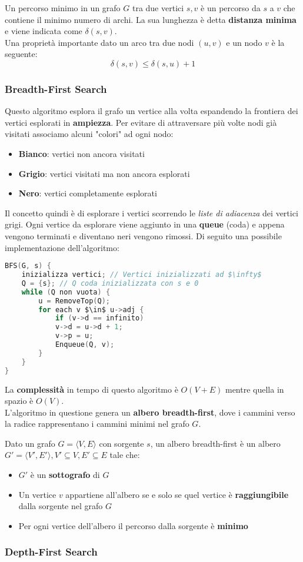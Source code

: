 \begin{definition}
	Un percorso minimo in un grafo $G$ tra due vertici $s, v$ è un percorso da $s$ a $v$  che contiene il minimo numero di archi. La sua lunghezza è detta \textbf{distanza minima} e viene indicata come $\delta(s, v)$. \\
	Una proprietà importante dato un arco tra due nodi $(u,v)$ e un nodo $v$ è la seguente:
	\begin{equation*}
		\delta(s, v) \leq \delta(s, u) + 1
	\end{equation*}
\end{definition}
\subsubsection{Breadth-First Search}
Questo algoritmo esplora il grafo un vertice alla volta espandendo la frontiera dei vertici esplorati in \textbf{ampiezza}. Per evitare di attraversare più volte nodi già visitati associamo alcuni "colori" ad ogni nodo:
\begin{itemize}
	\item \textbf{Bianco}: vertici non ancora visitati
	\item \textbf{Grigio}: vertici visitati ma non ancora esplorati
	\item  \textbf{Nero}: vertici completamente esplorati
\end{itemize}
Il concetto quindi è di esplorare i vertici scorrendo le \emph{liste di adiacenza} dei vertici grigi. Ogni vertice da esplorare viene aggiunto in una \textbf{queue} (coda) e appena vengono terminati e diventano neri vengono rimossi. Di seguito una possibile implementazione dell'algoritmo:
\begin{lstlisting}[language=C, caption=Implementazione di BFS, mathescape=true]
BFS(G, s) {
	inizializza vertici; // Vertici inizializzati ad $\infty$
	Q = {s}; // Q coda inizializzata con s e 0
	while (Q non vuota) {
		u = RemoveTop(Q);
		for each v $\in$ u->adj {
			if (v->d == infinito)
			v->d = u->d + 1;
			v->p = u;
			Enqueue(Q, v);
		}
	}
}
\end{lstlisting}
La \textbf{complessità} in tempo di questo algoritmo è $O(V + E)$ mentre quella in spazio è $O(V)$. \\
L'algoritmo in questione genera un \textbf{albero breadth-first}, dove i cammini verso la radice rappresentano i cammini minimi nel grafo $G$.
\begin{definition}
	Dato un grafo $G = \langle V, E \rangle$ con sorgente $s$, un albero breadth-first è un albero $G' = \langle V', E' \rangle, V' \subseteq V, E' \subseteq E$  tale che:
	\begin{itemize}
		\item $G'$ è un \textbf{sottografo} di $G$
		\item Un vertice $v$ appartiene all'albero se e solo se quel vertice è \textbf{raggiungibile} dalla sorgente nel grafo $G$
		\item Per ogni vertice dell'albero il percorso dalla sorgente è \textbf{minimo}
	\end{itemize}
\end{definition}
\subsubsection{Depth-First Search}